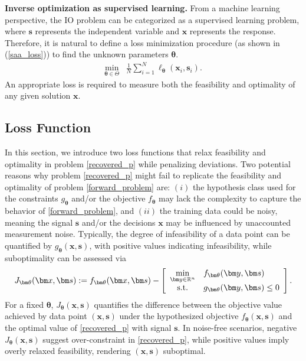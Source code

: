 \documentclass{article}
\def\x{\bm{x}}
\def\s{\bm{s}}
\def\btheta{\bm{\theta}}
\theoremstyle{plain}
\begin{document}
\textbf{Inverse optimization as supervised learning.}
From a machine learning perspective, the IO problem can be categorized as a supervised learning problem, where $\s$ represents the independent variable and $\x$ represents the response. Therefore, it is natural to define a loss minimization procedure (as shown in (\ref{saa_loss})) to find the unknown parameters $\btheta$.
\begin{equation}\label{saa_loss}
\begin{array}{ll}
        \displaystyle\min_{\bm \theta \in \Theta}&\displaystyle  \frac{1}{N}\sum_{i=1}^{N} \ell_{\bm \theta}(\bm x_i,\bm s_i).
\end{array}
\end{equation} 
An appropriate loss is required to measure both the feasibility and optimality of any given solution $\x$. 

\subsection{Loss Function}


In this section, we introduce two loss functions that relax feasibility and optimality in problem \eqref{recovered_p} while penalizing deviations. Two potential reasons why problem \eqref{recovered_p} might fail to replicate the feasibility and optimality of problem \eqref{forward_problem} are: $(i)$ the hypothesis class used for the constraints $g_{\bm \theta}$ and/or the objective $f_{\bm \theta}$ may lack the complexity to capture the behavior of \eqref{forward_problem}, and $(ii)$ the training data could be noisy, meaning the signal $\bm s$ and/or the decisions $\bm x$ may be influenced by unaccounted measurement noise. Typically, the degree of infeasibility of a data point can be quantified by $g_{\bm \theta}(\bm x,\bm s)$, with positive values indicating infeasibility, while suboptimality can be assessed via
\begin{equation}\label{function:suboptimality}
    J_{\bm\theta}(\bm x, \bm s):= f_{\bm \theta}(\bm x,\bm s) -  \left[
    \begin{array}{cl}
\displaystyle\min_{\bm y\in\mathbb{R}^n}  & f_{\bm \theta}(\bm y,\bm s)\\
{\rm s.t.}& g_{\bm \theta}(\bm y,\bm s) \leq 0
    \end{array}
    \right].
\end{equation}
For a fixed $\bm\theta$, $J_{\bm\theta}(\bm x, \bm s)$ quantifies the difference between the objective value achieved by data point $(\bm x, \bm s)$ under the hypothesized objective $f_{\bm \theta}(\bm x,\bm s)$ and the optimal value of \eqref{recovered_p} with signal $\bm s$. In noise-free scenarios, negative $J_{\bm\theta}(\bm x, \bm s)$ suggest over-constraint in \eqref{recovered_p}, while positive values imply overly relaxed feasibility, rendering $(\bm x, \bm s)$ suboptimal.
\end{document}
